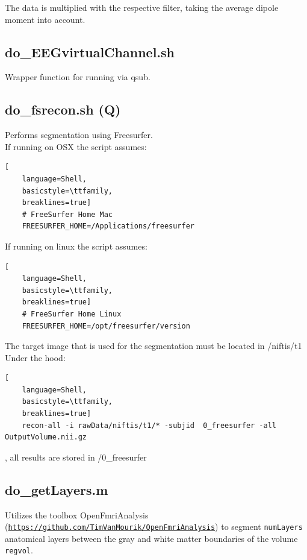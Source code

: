 \documentclass[12pt,a4paper]{scrartcl}
\begin{document}
The data is multiplied with the respective filter, taking the average dipole moment into account.\\

\subsection{do\_EEGvirtualChannel.sh}
\label{sh:virtch}
Wrapper function for running \texttt{} via qsub.\\

\subsection{do\_fsrecon.sh (Q)}
\label{sh:fsrecon}
Performs segmentation using Freesurfer.\\

\noindent If running on OSX the script assumes:
\begin{lstlisting}[
    language=Shell,
    basicstyle=\ttfamily,
    breaklines=true]
    # FreeSurfer Home Mac
    FREESURFER_HOME=/Applications/freesurfer
\end{lstlisting}

\noindent If running on linux the script assumes:\\
\begin{lstlisting}[
    language=Shell,
    basicstyle=\ttfamily,
    breaklines=true]
    # FreeSurfer Home Linux
    FREESURFER_HOME=/opt/freesurfer/version
\end{lstlisting}

\noindent The target image that is used for the segmentation must be located in /niftis/t1\\

\noindent Under the hood:
\begin{lstlisting}[
    language=Shell,
    basicstyle=\ttfamily,
    breaklines=true]
    recon-all -i rawData/niftis/t1/* -subjid  0_freesurfer -all OutputVolume.nii.gz
\end{lstlisting}
, all results are stored in /0\_freesurfer\\

\subsection{do\_getLayers.m}
\label{m:getLyr}
Utilizes the toolbox OpenFmriAnalysis (\href{https://github.com/TimVanMourik/OpenFmriAnalysis}{\nolinkurl{https://github.com/TimVanMourik/OpenFmriAnalysis}}) to segment \texttt{numLayers} anatomical layers between the gray and white matter boundaries of the volume \texttt{regvol}.\\
\end{document}
